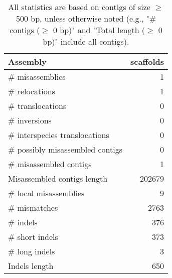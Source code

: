 \documentclass[12pt,a4paper]{article}
\begin{document}
\begin{table}[ht]
\begin{center}
\caption{All statistics are based on contigs of size $\geq$ 500 bp, unless otherwise noted (e.g., "\# contigs ($\geq$ 0 bp)" and "Total length ($\geq$ 0 bp)" include all contigs).}
\begin{tabular}{|l*{1}{|r}|}
\hline
Assembly & scaffolds \\ \hline
\# misassemblies & 1 \\ \hline
\hspace{5mm}\# relocations & 1 \\ \hline
\hspace{5mm}\# translocations & 0 \\ \hline
\hspace{5mm}\# inversions & 0 \\ \hline
\hspace{5mm}\# interspecies translocations & 0 \\ \hline
\# possibly misassembled contigs & 0 \\ \hline
\# misassembled contigs & 1 \\ \hline
Misassembled contigs length & 202679 \\ \hline
\# local misassemblies & 9 \\ \hline
\# mismatches & 2763 \\ \hline
\# indels & 376 \\ \hline
\hspace{5mm}\# short indels & 373 \\ \hline
\hspace{5mm}\# long indels & 3 \\ \hline
Indels length & 650 \\ \hline
\end{tabular}
\end{center}
\end{table}
\end{document}
